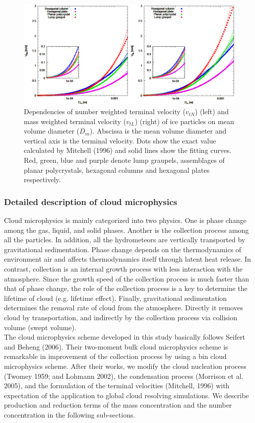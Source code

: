 \begin{figure}[htbp]
\begin{center}
\includegraphics[scale=0.4]{./figure/D_vt_sn14-ice-1.eps}
\end{center}
\caption{Dependencies of number weighted terminal velocity ($v_{tN}$) (left) and mass weighted terminal velocity ($v_{tL}$) (right) of ice particles on mean volume diameter ($D_{m}$). Abscissa is the mean volume diameter and vertical axis is the terminal velocity. Dots show the exact value calculated by Mitchell (1996) and solid lines show the fitting curves. Red, green, blue and purple denote lump graupels, assemblages of planar polycrystals, hexagonal columns and hexagonal plates respectively.}
\label{figsn2-14}
\end{figure}

\subsubsection{Detailed description of cloud microphysics}
Cloud microphysics is mainly categorized into two physics. One is phase change among the gas, liquid, and solid phases. Another is the collection process among all the particles. In addition, all the hydrometeors are vertically transported by gravitational sedimentation. Phase change depends on the thermodynamics of environment air and affects thermodynamics itself through latent heat release. In contrast, collection is an internal growth process with less interaction with the atmosphere. Since the growth speed of the collection process is much faster than that of phase change, the role of the collection process is a key to determine the lifetime of cloud (e.g. lifetime effect). Finally, gravitational sedimentation determines the removal rate of cloud from the atmosphere. Directly it removes cloud by transportation, and indirectly by the collection process via collision volume (swept volume).\\
The cloud microphysics scheme developed in this study basically follows Seifert and Beheng (2006). Their two-moment bulk cloud microphysics scheme is remarkable in improvement of the collection process by using a bin cloud microphysics scheme. After their works, we modify the cloud nucleation process (Twomey 1959; and Lohmann 2002), the condensation process (Morrison et al. 2005), and the formulation of the terminal velocities (Mitchell, 1996) with expectation of the application to global cloud resolving simulations. We describe production and reduction terms of the mass concentration and the number concentration in the following sub-sections.


